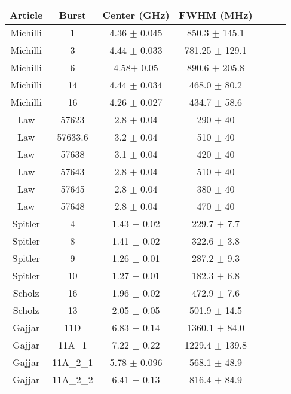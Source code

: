 \documentclass[french, a4paper,11pt]{report}
\begin{document}
\begin{tabular}{|c|c|c|c|c|c|c|}	
\hline
Article & Burst & Center (GHz) & FWHM (MHz) \\
\hline
Michilli & 1 & 4.36 $\pm$ 0.045 & 850.3 $\pm$ 145.1  \\

Michilli & 3 & 4.44 $\pm$ 0.033 & 781.25 $\pm$ 129.1  \\

Michilli & 6 & 4.58$\pm$ 0.05 & 890.6 $\pm$ 205.8  \\

Michilli & 14 & 4.44 $\pm$ 0.034 & 468.0 $\pm$ 80.2  \\

Michilli & 16 & 4.26 $\pm$ 0.027 & 434.7 $\pm$ 58.6  \\
\hline
Law & 57623 & 2.8 $\pm$ 0.04 & 290 $\pm$ 40 \\

Law & 57633.6 & 3.2 $\pm$ 0.04 & 510 $\pm$ 40 \\

Law & 57638 & 3.1 $\pm$ 0.04 & 420 $\pm$ 40 \\

Law & 57643 & 2.8 $\pm$ 0.04 & 510 $\pm$ 40 \\

Law & 57645 & 2.8 $\pm$ 0.04 & 380 $\pm$ 40 \\

Law & 57648 & 2.8 $\pm$ 0.04 & 470 $\pm$ 40 \\

\hline

Spitler & 4 & 1.43 $\pm$ 0.02 & 229.7 $\pm$ 7.7 \\

Spitler & 8 & 1.41 $\pm$ 0.02 & 322.6 $\pm$ 3.8 \\

Spitler & 9 & 1.26 $\pm$ 0.01 & 287.2 $\pm$ 9.3 \\

Spitler & 10 & 1.27 $\pm$ 0.01 & 182.3 $\pm$ 6.8 \\

\hline
Scholz & 16 & 1.96 $\pm$ 0.02 & 472.9 $\pm$ 7.6 \\

Scholz & 13 & 2.05 $\pm$ 0.05 & 501.9 $\pm$ 14.5 \\
\hline
Gajjar & 11D & 6.83 $\pm$ 0.14 & 1360.1 $\pm$ 84.0 \\
Gajjar & 11A\_1 & 7.22 $\pm$ 0.22 & 1229.4 $\pm$ 139.8 \\
Gajjar & 11A\_2\_1 & 5.78 $\pm$ 0.096 & 568.1 $\pm$ 48.9 \\
Gajjar & 11A\_2\_2 & 6.41 $\pm$ 0.13 & 816.4 $\pm$ 84.9 \\
\hline
\end{tabular}
\end{document}
